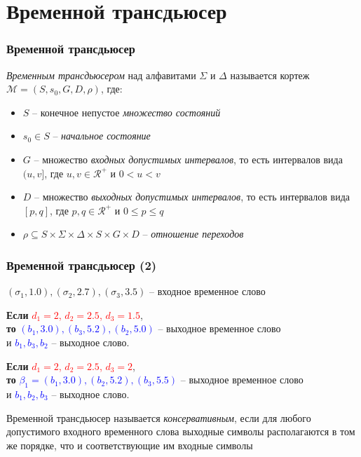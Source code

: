 \documentclass{beamer}
\begin{document}
\section{Временной трансдьюсер}

\begin{frame}
\frametitle{Временной трансдьюсер}

\emph{Временным трансдьюсером} над алфавитами $\Sigma$ и $\Delta$ называется кортеж $\mathcal{M} = (S, s_0, G, D, \rho)$, где:
	\begin{itemize}
		\item $S$ -- конечное непустое \emph{множество состояний}
		\item $s_0 \in S$ -- \emph{начальное состояние}
		\item $G$ -- множество \emph{входных допустимых интервалов}, то есть интервалов вида $(u, v]$, где $u, v \in \mathcal{R^{+}}$ и $0 < u < v$
		\item $D$ -- множество \emph{выходных допустимых интервалов}, то есть интервалов вида $[p, q]$, где $p, q \in \mathcal{R^{+}}$ и $0 \leq p \leq q$
		\item $\rho \subseteq S \times \Sigma \times \Delta \times S \times G \times D$ -- \emph{отношение переходов}
	\end{itemize}

\end{frame}


\begin{frame}
\frametitle{Временной трансдьюсер (2)}

$(\sigma_1, 1.0), (\sigma_2, 2.7), (\sigma_3, 3.5)$ -- входное временное слово

\textbf{Если} \textcolor{red}{$d_1 = 2$, $d_2 = 2.5$, $d_3 = 1.5$}, \\
\textbf{то} \textcolor{blue}{$(b_1, 3.0), (b_3, 5.2), (b_2, 5.0)$} -- выходное временное слово \\
и \textcolor{blue}{$b_1, b_3, b_2$} -- выходное слово.


\textbf{Если} \textcolor{red}{$d_1 = 2$, $d_2 = 2.5$, $d_3 = 2$}, \\
\textbf{то} \textcolor{blue}{$\beta_1 = (b_1, 3.0), (b_2, 5.2), (b_3, 5.5)$} -- выходное временное слово \\
и \textcolor{blue}{$b_1, b_2, b_3$} -- выходное слово.




Временной трансдьюсер называется \emph{консервативным}, если для любого допустимого входного временного слова выходные символы располагаются в том же порядке, что и соответствующие им входные символы

\end{frame}
\end{document}
